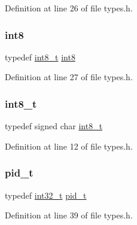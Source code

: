 Definition at line 26 of file types.\+h.

\mbox{\label{a00038_aa79c2d3de4fcd200458c406f40b2ae64_aa79c2d3de4fcd200458c406f40b2ae64}} 
\subsubsection{\texorpdfstring{int8}{int8}}
{\footnotesize\ttfamily typedef \hyperlink{a00038_aef44329758059c91c76d334e8fc09700_aef44329758059c91c76d334e8fc09700}{int8\+\_\+t} \hyperlink{a00038_aa79c2d3de4fcd200458c406f40b2ae64_aa79c2d3de4fcd200458c406f40b2ae64}{int8}}



Definition at line 27 of file types.\+h.

\mbox{\label{a00038_aef44329758059c91c76d334e8fc09700_aef44329758059c91c76d334e8fc09700}} 
\subsubsection{\texorpdfstring{int8\+\_\+t}{int8\_t}}
{\footnotesize\ttfamily typedef signed char \hyperlink{a00038_aef44329758059c91c76d334e8fc09700_aef44329758059c91c76d334e8fc09700}{int8\+\_\+t}}



Definition at line 12 of file types.\+h.

\mbox{\label{a00038_a4da13e794717e169a75d9705a62b6f41_a4da13e794717e169a75d9705a62b6f41}} 
\subsubsection{\texorpdfstring{pid\+\_\+t}{pid\_t}}
{\footnotesize\ttfamily typedef \hyperlink{a00038_ab1967d8591af1a4e48c37fd2b0f184d0_ab1967d8591af1a4e48c37fd2b0f184d0}{int32\+\_\+t} \hyperlink{a00038_a4da13e794717e169a75d9705a62b6f41_a4da13e794717e169a75d9705a62b6f41}{pid\+\_\+t}}



Definition at line 39 of file types.\+h.

